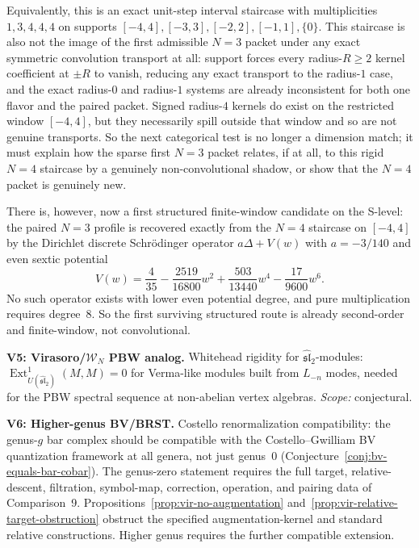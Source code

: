 \begin{remark}
Equivalently, this is an exact unit-step
interval staircase with multiplicities
$1,3,4,4,4$ on supports $[-4,4],[-3,3],[-2,2],[-1,1],\{0\}$.
This staircase is also not the image of the first admissible $N=3$
packet under any exact symmetric convolution transport at all: support
forces every radius-$R\ge2$ kernel coefficient at $\pm R$ to vanish,
reducing any exact transport to the radius-$1$ case, and the exact
radius-$0$ and radius-$1$ systems are already inconsistent for both one
flavor and the paired packet.  Signed radius-$4$ kernels do exist on
the restricted window $[-4,4]$, but they necessarily spill outside that
window and so are not genuine transports.  So the next categorical test
is no longer a dimension match; it must explain how the sparse first
$N=3$ packet relates, if at all, to this rigid $N=4$ staircase by a
genuinely non-convolutional shadow, or show that the $N=4$ packet is
genuinely new.

There is, however, now a first structured finite-window candidate on the
S-level: the paired $N=3$ profile is recovered exactly from the
$N=4$ staircase on $[-4,4]$ by the Dirichlet discrete Schr\"odinger
operator $a\Delta + V(w)$ with
$a=-3/140$ and even sextic potential
\[
V(w)=\frac{4}{35}
-\frac{2519}{16800}w^2
+\frac{503}{13440}w^4
-\frac{17}{9600}w^6.
\]
No such operator exists with lower even potential degree, and pure
multiplication requires degree~$8$.  So the first surviving structured
route is already second-order and finite-window, not convolutional.

\smallskip
\noindent\textbf{V5: Virasoro/$\mathcal{W}_N$ PBW analog.}
Whitehead rigidity for $\widehat{\mathfrak{sl}}_2$-modules:
$\operatorname{Ext}^1_{U(\widehat{\mathfrak{sl}}_2)}(M, M) = 0$ for
Verma-like modules built from $L_{-n}$ modes, needed for the PBW
spectral sequence at non-abelian vertex algebras.
\emph{Scope:} conjectural.

\smallskip
\noindent\textbf{V6: Higher-genus BV/BRST.}
Costello renormalization compatibility: the genus-$g$ bar complex should
be compatible with the Costello--Gwilliam BV quantization framework
at all genera, not just genus~$0$
(Conjecture~\ref{conj:bv-equals-bar-cobar}).
The genus-zero statement requires the full target, relative-descent, filtration, symbol-map, correction, operation, and pairing data of Comparison~9.
Propositions~\ref{prop:vir-no-augmentation} and~\ref{prop:vir-relative-target-obstruction} obstruct the specified augmentation-kernel and standard relative constructions.
Higher genus requires the further compatible extension.


\end{remark}
